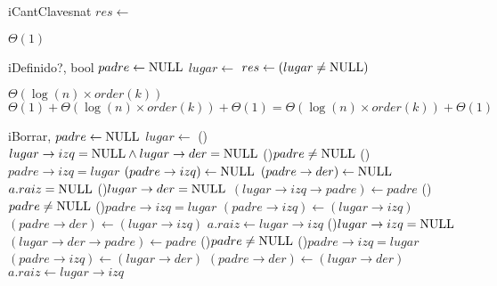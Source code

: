 \begin{Algoritmos}
  \begin{algoritmo}{iCantClaves}{}{nat}
    $res \gets$  
  \end{algoritmo}
  \datosAlgoritmo{} %
  {} %
  {} %
  {$\Theta(1)$} %
  {} %

  \begin{algoritmo}{iDefinido?}{, }{bool}
     $padre \gets \textrm{NULL}$ 
     $lugar \gets$  
    $res \gets (lugar \neq \textrm{NULL})$ 
  \end{algoritmo}
  \datosAlgoritmo{} %
  {} %
  {} %
  {$\Theta(\log(n) \times order(k))$} %
  {$\Theta(1) + \Theta(\log(n) \times order(k)) + \Theta(1) = \Theta(\log(n) \times order(k)) + \Theta(1)$} %

  \begin{algoritmo}{iBorrar}{, }{}
     $padre \gets \textrm{NULL}$ 
     $lugar \gets$  
    \uIf(){$lugar \to izq = \textrm{NULL} \land lugar \to der = \textrm{NULL}$}{
      \eIf(){$padre \neq \textrm{NULL}$}{
        \eIf(){$padre \to izq = lugar$}{
          $(padre \to izq) \gets \textrm{NULL}$ 
        }{
          $(padre \to der) \gets \textrm{NULL}$ 
        }
         
      }{
        $a.raiz = \textrm{NULL}$ 
      }
    }\uElseIf(){$lugar \to der = \textrm{NULL}$}{
      $(lugar \to izq \to padre) \gets padre$ 
      \eIf(){$padre \neq \textrm{NULL}$}{
        \eIf(){$padre \to izq = lugar$}{
          $(padre \to izq) \gets (lugar \to izq)$ 
        }{
          $(padre \to der) \gets (lugar \to izq)$ 
        }
         
      }{
        $a.raiz \gets lugar \to izq$ 
      }
    }\uElseIf(){$lugar \to izq = \textrm{NULL}$}{
      $(lugar \to der \to padre) \gets padre$ 
      \eIf(){$padre \neq \textrm{NULL}$}{
        \eIf(){$padre \to izq = lugar$}{
          $(padre \to izq) \gets (lugar \to der)$ 
        }{
          $(padre \to der) \gets (lugar \to der)$ 
        }
         
      }{
        $a.raiz \gets lugar \to izq$ 
      }
    }
  \end{algoritmo}


\end{Algoritmos}
